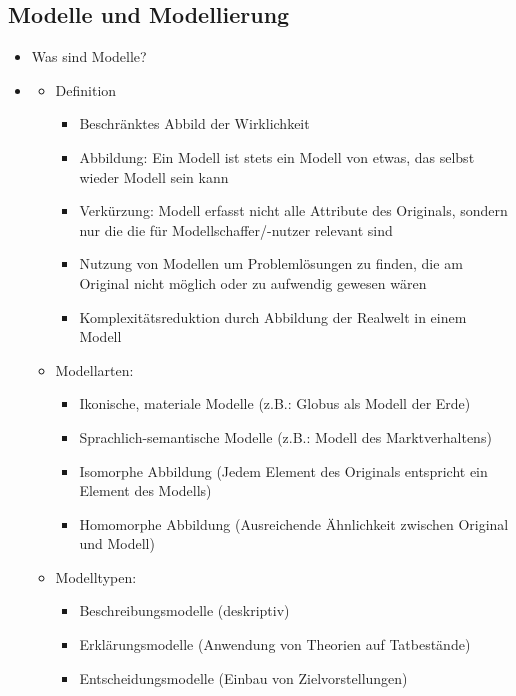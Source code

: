 \documentclass[11pt,a4paper]{article}
\begin{document}
\subsection{Modelle und Modellierung}
\begin{itemize}


\item Was sind Modelle?
\item[] 
	\begin{itemize}
	
	\item Definition
		\begin{itemize}
		\item Beschränktes Abbild der Wirklichkeit
		\item Abbildung: Ein Modell ist stets ein Modell von etwas, das selbst wieder Modell sein kann
		\item Verkürzung: Modell erfasst nicht alle Attribute des Originals, sondern nur die die für Modellschaffer/-nutzer relevant sind
		\item Nutzung von Modellen um Problemlösungen zu finden, die am Original nicht möglich oder zu aufwendig gewesen wären
		\item Komplexitätsreduktion durch Abbildung der Realwelt in einem Modell
		\end{itemize}

	\item Modellarten:
		\begin{itemize}
		\item Ikonische, materiale Modelle (z.B.: Globus als Modell der Erde)
		\item Sprachlich-semantische Modelle (z.B.: Modell des Marktverhaltens)
		\item Isomorphe Abbildung (Jedem Element des Originals entspricht ein Element des Modells)
		\item Homomorphe Abbildung (Ausreichende Ähnlichkeit zwischen Original und Modell)
		\end{itemize}

	\item Modelltypen:
		\begin{itemize}
		\item Beschreibungsmodelle (deskriptiv)
		\item Erklärungsmodelle (Anwendung von Theorien auf Tatbestände)
		\item Entscheidungsmodelle (Einbau von Zielvorstellungen)
		\end{itemize}			
	
	\end{itemize}


\end{itemize}
\end{document}
